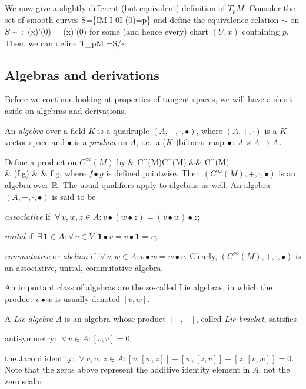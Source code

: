 \br
We now give a slightly different (but equivalent) definition of $T_pM$. Consider the set of smooth curves
\bse
S=\{\gamma\cl I\to M \mid {} I\se \R {} 0\in I  \gamma(0)=p\}
\ese
and define the equivalence relation $\sim$ on $S$
\bse
\gamma \sim \delta \ :\eqv \ (x\circ \gamma)'(0) = (x\circ \delta)'(0)  
\ese
for some (and hence every) chart $(U,x)$ containing $p$. Then, we can define
\bse
T_pM:=S/\!\sim.
\ese
\er

\subsection{Algebras and derivations}

Before we continue looking at properties of tangent spaces, we will have a short aside on algebras and derivations.

\bd
An \emph{algebra} over a field $K$ is a quadruple $(A,+,\cdot,\bullet)$, where $(A,+,\cdot)$ is a $K$-vector space and $\bullet$ is a \emph{product} on $A$, i.e.\ a ($K$-)bilinear map $\bullet \colon A\times A \to A$.
\ed

\be
Define a product on $C^\infty(M)$ by
\bullet \cl & C^\infty(M)\times C^\infty(M) &\to& C^\infty(M)\\
& (f,g) & \mapsto & f \bullet g,
\ei
where $f \bullet g$ is defined pointwise. Then $(C^\infty(M),+,\cdot,\bullet)$ is an algebra over $\mathbb{R}$.
\ee
The usual qualifiers apply to algebras as well.
\bd
An algebra $(A,+,\cdot,\bullet)$ is said to be
\ben[label=\roman*)]
\item \emph{associative} if $\ \forall \, v,w,z\in A :  v\bullet (w\bullet z) = (v\bullet w)\bullet z$;
\item \emph{unital} if $\ \exists \, \mathbf{1} \in A : \forall \, v \in V : \mathbf{1}\bullet v = v \bullet \mathbf{1} = v$;
\item \emph{commutative} or \emph{abelian} if $\ \forall \, v,w\in A :  v\bullet w = w\bullet v$.
\een
\ed
\be
Clearly, $(C^\infty(M),+,\cdot,\bullet)$ is an associative, unital, commutative algebra.
\ee

An important class of algebras are the so-called Lie algebras, in which the product $v\bullet w$ is usually denoted $[v,w]$.

\bd
A \emph{Lie algebra} $A$ is an algebra whose product $[-,-]$, called \emph{Lie bracket}, satisfies
\ben[label=\roman*)]
\item antisymmetry: $\ \forall\, v\in A : [v,v]=0$;
\item the Jacobi identity: $\ \forall\, v,w,z\in A : [v,[w,z]] + [w,[z,v]] + [z,[v,w]] = 0$.
\een
Note that the zeros above represent the additive identity element in $A$, not the zero scalar
\ed

